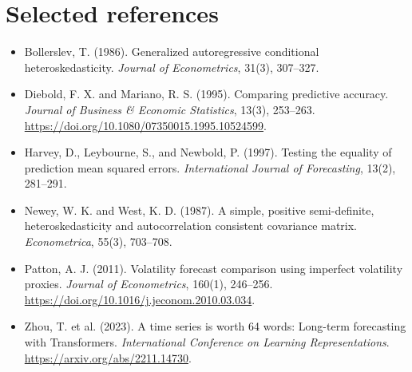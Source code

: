 \documentclass[11pt,a4paper]{article}
\begin{document}
\section*{Selected references}
\begin{itemize}
\item Bollerslev, T. (1986). Generalized autoregressive conditional heteroskedasticity.
  \emph{Journal of Econometrics}, 31(3), 307--327.
\item Diebold, F. X. and Mariano, R. S. (1995). Comparing predictive accuracy.
  \emph{Journal of Business \& Economic Statistics}, 13(3), 253--263.
  \url{https://doi.org/10.1080/07350015.1995.10524599}.
\item Harvey, D., Leybourne, S., and Newbold, P. (1997). Testing the equality of prediction mean
  squared errors. \emph{International Journal of Forecasting}, 13(2), 281--291.
\item Newey, W. K. and West, K. D. (1987). A simple, positive semi-definite, heteroskedasticity
  and autocorrelation consistent covariance matrix. \emph{Econometrica}, 55(3), 703--708.
\item Patton, A. J. (2011). Volatility forecast comparison using imperfect volatility proxies.
  \emph{Journal of Econometrics}, 160(1), 246--256.
  \url{https://doi.org/10.1016/j.jeconom.2010.03.034}.
\item Zhou, T. et al. (2023). A time series is worth 64 words: Long-term forecasting with
  Transformers. \emph{International Conference on Learning Representations}.
  \url{https://arxiv.org/abs/2211.14730}.
\end{itemize}
\end{document}
